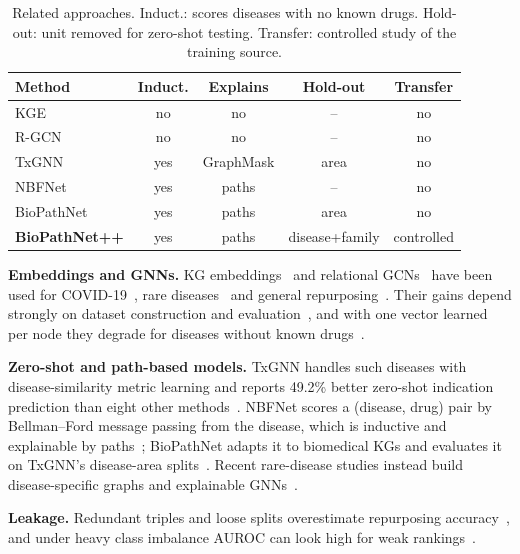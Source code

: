 \documentclass{svproc}
\newcommand{\sysname}{BioPathNet++\xspace}
\begin{document}
\begin{table}[H]
\centering
\caption{Related approaches. Induct.: scores diseases with no known drugs. Hold-out: unit removed for zero-shot testing. Transfer: controlled study of the training source.}
\label{tab:related}
\footnotesize
\setlength{\tabcolsep}{2pt}
\begin{tabular}{lcccc}
\toprule
Method & Induct. & Explains & Hold-out & Transfer\\
\midrule
KGE~\citep{bordes2013transe,yang2015distmult,sun2019rotate} & no & no & -- & no\\
R-GCN~\citep{schlichtkrull2018rgcn} & no & no & -- & no\\
TxGNN~\citep{huang2024txgnn} & yes & GraphMask & area & no\\
NBFNet~\citep{zhu2021nbfnet} & yes & paths & -- & no\\
BioPathNet~\citep{hu2026biopathnet} & yes & paths & area & no\\
\textbf{\sysname} & yes & paths & disease+family & controlled\\
\bottomrule
\end{tabular}
\end{table}

\textbf{Embeddings and GNNs.} KG embeddings~\citep{bordes2013transe,yang2015distmult,sun2019rotate} and relational GCNs~\citep{schlichtkrull2018rgcn} have been used for COVID-19~\citep{zhang2021covidkg,morselli2021covid}, rare diseases~\citep{sosa2020rare} and general repurposing~\citep{gao2022kgpredict,bang2023dreamwalk}. Their gains depend strongly on dataset construction and evaluation~\citep{bonner2022kge,ali2021pykeen}, and with one vector learned per node they degrade for diseases without known drugs~\citep{huang2024txgnn}.

\textbf{Zero-shot and path-based models.} TxGNN handles such diseases with disease-similarity metric learning and reports 49.2\% better zero-shot indication prediction than eight other methods~\citep{huang2024txgnn}. NBFNet scores a (disease, drug) pair by Bellman--Ford message passing from the disease, which is inductive and explainable by paths~\citep{zhu2021nbfnet}; BioPathNet adapts it to biomedical KGs and evaluates it on TxGNN's disease-area splits~\citep{hu2026biopathnet}. Recent rare-disease studies instead build disease-specific graphs and explainable GNNs~\citep{papadimas2026neuromuscular,perdomo2026rdexplainer}.

\textbf{Leakage.} Redundant triples and loose splits overestimate repurposing accuracy~\citep{briere2026leakage,kapoor2023leakage}, and under heavy class imbalance AUROC can look high for weak rankings~\citep{saito2015prc}.
\end{document}
